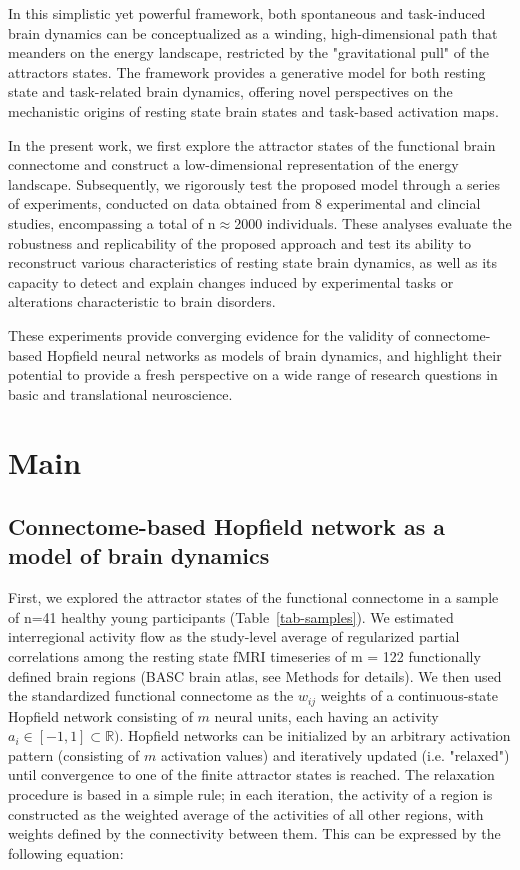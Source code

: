 \documentclass{article}
\begin{document}
In this simplistic yet powerful framework, both spontaneous and task-induced brain dynamics can be conceptualized as a
winding, high-dimensional path that meanders on the energy landscape, restricted by the "gravitational pull" of the
attractors states.
The framework provides a generative model for both resting state and task-related brain dynamics, offering novel
perspectives on the mechanistic origins of resting state brain states and task-based activation maps.

In the present work, we first explore the attractor states of the functional brain connectome and construct a
low-dimensional representation of the energy landscape.
Subsequently, we rigorously test the proposed model through a series of experiments, conducted on data obtained
from 8 experimental and clincial studies, encompassing a total of n$\approx$2000 individuals.
These analyses evaluate the robustness and replicability of the proposed approach and test its ability to reconstruct
various characteristics of resting state brain dynamics, as well as its capacity to detect and explain changes induced
by experimental tasks or alterations characteristic to brain disorders.

These experiments provide converging evidence for the validity of connectome-based Hopfield neural networks as models
of brain dynamics, and highlight their potential to provide a fresh perspective on a wide range of research questions
in basic and translational neuroscience.

\section{\textbf{Main}}\label{Main}

\subsection{Connectome-based Hopfield network as a model of brain dynamics}\label{Connectome-based Hopfield network as a model of brain dynamics}

First, we explored the attractor states of the functional connectome in a sample of n=41 healthy young
participants (Table~\ref{tab-samples}). We estimated interregional activity flow \citep{cole2016activity, ito2017cognitive}
as the study-level average of regularized partial correlations among the resting state fMRI timeseries of m = 122
functionally defined brain regions (BASC brain atlas, see Methods for details). We then used the standardized
functional connectome as the $w_{ij}$  weights of a continuous-state Hopfield network
\citep{hopfield1982neural, koiran1994dynamics} consisting of $m$ neural units, each having an activity
$a_i \in [ -1,1] \subset \mathbb{R})$. Hopfield networks can be initialized by an arbitrary activation pattern (consisting of
$m$ activation values) and iteratively updated (i.e. "relaxed") until convergence to one of the finite attractor states is reached. The relaxation procedure is based in a simple rule; in each iteration, the activity of a region is constructed as the weighted average of the activities of all other regions, with weights defined by the connectivity between them.
This can be expressed by the following equation:
\end{document}

